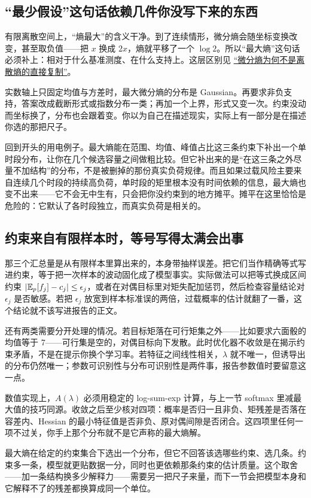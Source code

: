 \subsection{``最少假设''这句话依赖几件你没写下来的东西}

有限离散空间上，``熵最大''的含义干净。到了连续情形，微分熵会随坐标变换改变，甚至取负值——把 \(x\) 换成 \(2x\)，熵就平移了一个 \(\log 2\)。所以``最大熵''这句话必须补上：相对于什么基准测度、在什么支持上。这层区别见 \hyperref[sec:07-Information-Theory/01-Information-and-Entropy/03]{``微分熵为何不是离散熵的直接复制''}。

实数轴上只固定均值与方差时，最大微分熵的分布是 Gaussian。再要求非负支持，答案改成截断形式或指数分布一类；再加一个上界，形式又变一次。约束没动而坐标换了，分布也会跟着变。你以为自己在描述现实，实际上有一部分是在描述你选的那把尺子。

回到开头的用电例子。最大熵能在范围、均值、峰值占比这三条约束下补出一个单时段分布，让你在几个候选容量之间做粗比较。但它补出来的是``在这三条之外尽量不加结构''的分布，不是被删掉的那份真实负荷规律。而且如果过载风险主要来自连续几个时段的持续高负荷，单时段的矩里根本没有时间依赖的信息，最大熵也变不出来——它不会无中生有，只会把你没约束到的地方摊平。摊平在这里恰恰是危险的：它默认了各时段独立，而真实负荷是相关的。

\subsection{约束来自有限样本时，等号写得太满会出事}

那三个汇总量是从有限样本里算出来的，本身带抽样误差。把它们当作精确等式写进约束，等于把一次样本的波动固化成了模型事实。实际做法可以把等式换成区间约束 \(\left|\mathbb{E}_p[f_j]-c_j\right|\le\epsilon_j\)，或者在对偶目标里对矩失配加惩罚，然后检查容量结论对 \(\epsilon_j\) 是否敏感。若把 \(\epsilon_j\) 放宽到样本标准误的两倍，过载概率的估计就翻了一番，这个结论就不该写进报告的正文。

还有两类需要分开处理的情况。若目标矩落在可行矩集之外——比如要求六面骰的均值等于 7——可行集是空的，对偶目标向下发散。此时优化器不收敛是在揭示约束矛盾，不是在提示你换个学习率。若特征之间线性相关，\(\lambda\) 就不唯一，但诱导出的分布仍然唯一；参数可识别性与分布可识别性是两件事，报告参数值时要留意这一点。

数值实现上，\(A(\lambda)\) 必须用稳定的 log-sum-exp 计算，与上一节 softmax 里减最大值的技巧同源。收敛之后至少核对四项：概率是否归一且非负、矩残差是否落在容差内、Hessian 的最小特征值是否非负、原对偶间隙是否闭合。这四项里任何一项不过关，你手上那个分布就不是它声称的最大熵解。

最大熵在给定的约束集合下选出一个分布，但它不回答该选哪些约束、选几条。约束多一条，模型就更贴数据一分，同时也更依赖那条约束的估计质量。这个取舍——加一条结构换多少解释力——需要另一把尺子来量，而下一节会把模型本身和它解释不了的残差都换算成同一个单位。
